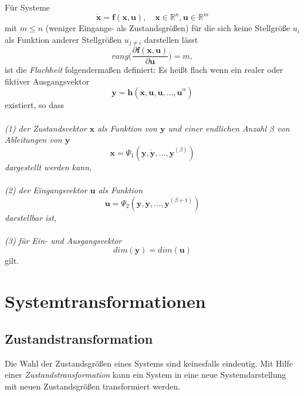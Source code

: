 		\begin{tcolorbox}[title=Definition: Flachheit]
			Für Systeme
			\[\bm{\dot{x}}=\bm{f(x,u)}, \quad \bm{x}\in \mathbb{R}^{n}, \bm{u}\in \mathbb{R}^{m}  \]
			mit $ m\leq n $ (weniger Eingangs- als Zustandsgrößen) für die sich keine Stellgröße $ u_{i} $ als Funktion anderer Stellgrößen $ u_{j\neq i} $ darstellen lässt
			\[rang\bigg(\dfrac{\partial\bm{f(x,u)}}{\partial\bm{u}}\bigg)=m, \]
			ist die \textit{Flachheit} folgendermaßen definiert:
			\tcblower
			Es heißt flach wenn ein realer oder fiktiver Ausgangsvektor	
			\[\bm{y} = \bm{h}(\bm{x,u,\dot{u},...,u}^{\alpha})\]
			existiert, so dass\\\\	
			\textit{(1) der Zustandsvektor $ \bm{x} $ als Funktion von $ \bm{y} $ und einer endlichen Anzahl $ \beta $ von Ableitungen von $ \bm{y} $}
			\[\bm{x} =\bm{\varPsi}_{1}(\bm{y,\dot{y},...,y}^{(\beta)}) \]
			\textit{dargestellt werden kann,}\\\\
			\textit{(2) der Eingangsvektor $ \bm{u} $ als Funktion}
			\[\bm{u} =\bm{\varPsi}_{2}(\bm{y,\dot{y},...,y}^{(\beta+1)}) \]
			\textit{darstellbar ist,}\\\\
			\textit{(3) für Ein- und Ausgangsvektor}
			\[dim(\bm{y}) = dim(\bm{u})\]
			gilt.
		\end{tcolorbox}	
	
	
\section{Systemtransformationen}
	\subsection{Zustandstransformation}
		Die Wahl der Zustandsgrößen eines Systems sind keinesfalls eindeutig. Mit Hilfe einer \textit{Zustandstransformation} kann ein System in eine neue Systemdarstellung mit neuen Zustandsgrößen transformiert werden.
